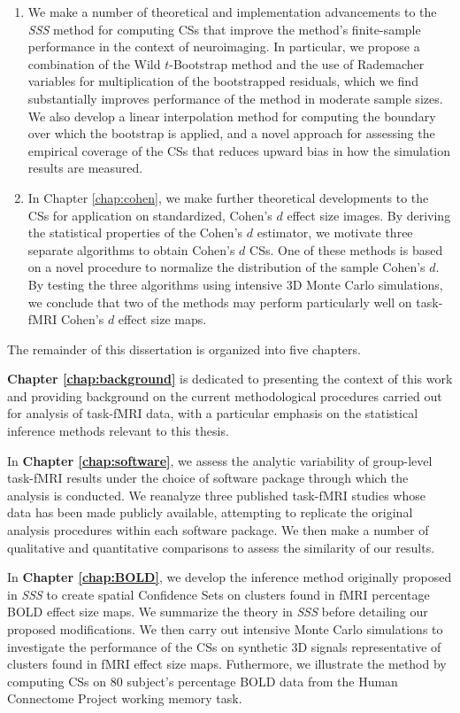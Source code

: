 \begin{enumerate}
\item We make a number of theoretical and implementation advancements to the \textit{SSS} method for computing CSs that improve the method's finite-sample performance in the context of neuroimaging. In particular, we propose a combination of the Wild $t$-Bootstrap method and the use of Rademacher variables for multiplication of the bootstrapped residuals, which we find substantially improves performance of the method in moderate sample sizes. We also develop a linear interpolation method for computing the boundary over which the bootstrap is applied, and a novel approach for assessing the empirical coverage of the CSs that reduces upward bias in how the simulation results are measured.

\item In Chapter \ref{chap:cohen}, we make further theoretical developments to the CSs for application on standardized, Cohen's $d$ effect size images. By deriving the statistical properties of the Cohen's $d$ estimator, we motivate three separate algorithms to obtain Cohen's $d$ CSs. One of these methods is based on a novel procedure to normalize the distribution of the sample Cohen's $d$. By testing the three algorithms using intensive 3D Monte Carlo simulations, we conclude that two of the methods may perform particularly well on task-fMRI Cohen's $d$ effect size maps.

\end{enumerate}


\noindent The remainder of this dissertation is organized into five chapters. 

\textbf{Chapter \ref{chap:background}} is dedicated to presenting the context of this work and providing background on the current methodological procedures carried out for analysis of task-fMRI data, with a particular emphasis on the statistical inference methods relevant to this thesis. 

In \textbf{Chapter \ref{chap:software}}, we assess the analytic variability of group-level task-fMRI results under the choice of software package through which the analysis is conducted. We reanalyze three published task-fMRI studies whose data has been made publicly available, attempting to replicate the original analysis procedures within each software package. We then make a number of qualitative and quantitative comparisons to assess the similarity of our results. 

In \textbf{Chapter \ref{chap:BOLD}}, we develop the inference method originally proposed in \textit{SSS} to create spatial Confidence Sets on clusters found in fMRI percentage BOLD effect size maps. We summarize the theory in \textit{SSS} before detailing our proposed modifications. We then carry out intensive Monte Carlo simulations to investigate the performance of the CSs on synthetic 3D signals representative of clusters found in fMRI effect size maps. Futhermore, we illustrate the method by computing CSs on 80 subject's percentage BOLD data from the Human Connectome Project working memory task.


